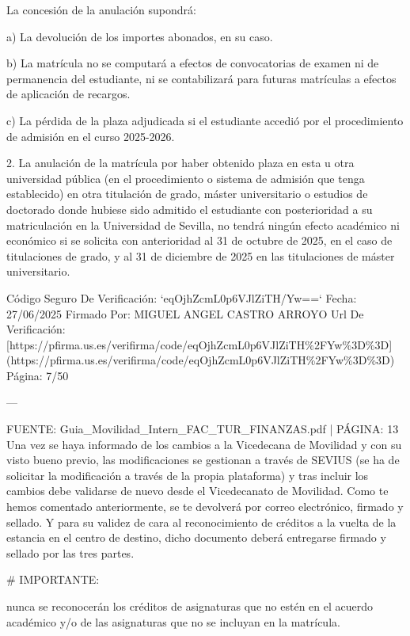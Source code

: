 \documentclass{article}
\begin{document}
\begin{itemize}
\begin{itemize}
\begin{scriptsize}
                  La concesión de la anulación supondrá:

                  a) La devolución de los importes abonados, en su caso.

                  b) La matrícula no se computará a efectos de convocatorias de examen ni de permanencia del estudiante, ni se contabilizará para futuras matrículas a efectos de aplicación de recargos.

                  c) La pérdida de la plaza adjudicada si el estudiante accedió por el procedimiento de admisión en el curso 2025-2026.

                  2. La anulación de la matrícula por haber obtenido plaza en esta u otra universidad pública (en el procedimiento o sistema de admisión que tenga establecido) en otra titulación de grado, máster universitario o estudios de doctorado donde hubiese sido admitido el estudiante con posterioridad a su matriculación en la Universidad de Sevilla, no tendrá ningún efecto académico ni económico si se solicita con anterioridad al 31 de octubre de 2025, en el caso de titulaciones de grado, y al 31 de diciembre de 2025 en las titulaciones de máster universitario.

                  Código Seguro De Verificación: `eqOjhZcmL0p6VJlZiTH/Yw==`
                  Fecha: 27/06/2025
                  Firmado Por: MIGUEL ANGEL CASTRO ARROYO
                  Url De Verificación: [https://pfirma.us.es/verifirma/code/eqOjhZcmL0p6VJlZiTH\%2FYw\%3D\%3D](https://pfirma.us.es/verifirma/code/eqOjhZcmL0p6VJlZiTH\%2FYw\%3D\%3D)
                  Página: 7/50

                  ---

                  FUENTE: Guia\_Movilidad\_Intern\_FAC\_TUR\_FINANZAS.pdf | PÁGINA: 13
                  Una vez se haya informado de los cambios a la Vicedecana de Movilidad y con su visto bueno previo, las modificaciones se gestionan a través de SEVIUS (se ha de solicitar la modificación a través de la propia plataforma) y tras incluir los cambios debe validarse de nuevo desde el Vicedecanato de Movilidad. Como te hemos comentado anteriormente, se te devolverá por correo electrónico, firmado y sellado. Y para su validez de cara al reconocimiento de créditos a la vuelta de la estancia en el centro de destino, dicho documento deberá entregarse firmado y sellado por las tres partes.

                  \# IMPORTANTE:

                  nunca se reconocerán los créditos de asignaturas que no estén en el acuerdo académico y/o de las asignaturas que no se incluyan en la matrícula.


\end{scriptsize}
\end{itemize}
\end{itemize}
\end{document}
